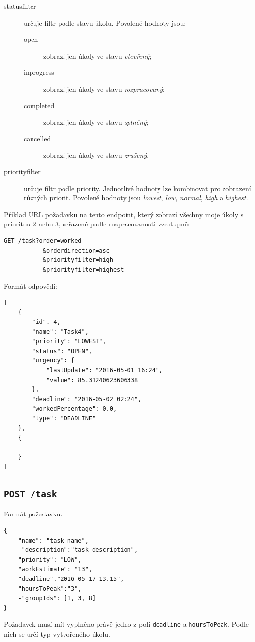 \documentclass[thesis=B,czech]{FITthesis}[2012/06/26]
\begin{document}
\begin{description}
				\item[statusfilter] určuje filtr podle stavu úkolu. Povolené hodnoty jsou:
				\begin{description}
					\item[open] zobrazí jen úkoly ve stavu \textit{otevřený};
					\item[inprogress] zobrazí jen úkoly ve stavu \textit{rozpracovaný};
					\item[completed] zobrazí jen úkoly ve stavu \textit{splněný};
					\item[cancelled] zobrazí jen úkoly ve stavu \textit{zrušený}.
				\end{description}							
				
				
				\item[priorityfilter] určuje filtr podle priority. Jednotlivé hodnoty lze kombinovat pro zobrazení různých priorit. Povolené hodnoty jsou \textit{lowest}, \textit{low}, \textit{normal}, \textit{high} a \textit{highest}.
			\end{description}
			
			\noindent
			Příklad URL požadavku na tento endpoint, který zobrazí všechny moje úkoly s prioritou 2 nebo 3, seřazené podle rozpracovanosti vzestupně:\\
			\begin{Verbatim}[obeytabs,tabsize=2]
  GET /task?order=worked
           &orderdirection=asc
           &priorityfilter=high
           &priorityfilter=highest
			\end{Verbatim}
			
			\noindent
			Formát odpovědi:
			\begin{Verbatim}[obeytabs,tabsize=2]
[
	{
		"id": 4,
		"name": "Task4",
		"priority": "LOWEST",
		"status": "OPEN",
		"urgency": {
			"lastUpdate": "2016-05-01 16:24",
			"value": 85.31240623606338
		},
		"deadline": "2016-05-02 02:24",
		"workedPercentage": 0.0,
		"type": "DEADLINE"
	},
	{
		...
	}
]
			\end{Verbatim}
			
			
		\subsection{\texttt{POST /task}}
			Formát požadavku:
			\begin{Verbatim}[obeytabs,tabsize=2]
{
	"name": "task name",
	-"description":"task description",
	"priority": "LOW",
	"workEstimate": "13",
	"deadline":"2016-05-17 13:15",
	"hoursToPeak":"3",
	-"groupIds": [1, 3, 8]
}
			\end{Verbatim}
			Požadavek musí mít vyplněno právě jedno z polí \texttt{deadline} a \texttt{hoursToPeak}. Podle nich se určí typ vytvořeného úkolu.
			
\end{document}
